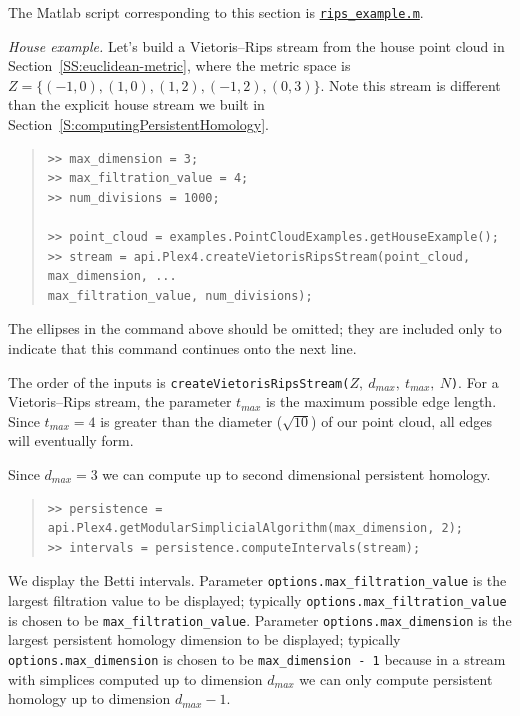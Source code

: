 \documentclass[amscd, amssymb, verbatim]{amsart}[12pt]
\theoremstyle{remark}
\theoremstyle{remark}
\theoremstyle{remark}
\begin{document}
The Matlab script corresponding to this section is \href{https://github.com/appliedtopology/javaplex/tree/master/src/matlab/for_distribution/tutorial_examples/rips_example.m}{\texttt{rips\_example.m}}. 

{\em House example.} Let's build a Vietoris--Rips stream from the house point cloud in Section~\ref{SS:euclidean-metric}, where the metric space is $Z=\{(-1,0),(1,0),(1,2),(-1,2),(0,3)\}$. Note this stream is different than the explicit house stream we built in Section~\ref{S:computingPersistentHomology}.

\begin{quote} \begin{verbatim}
>> max_dimension = 3;
>> max_filtration_value = 4;
>> num_divisions = 1000;

>> point_cloud = examples.PointCloudExamples.getHouseExample();
>> stream = api.Plex4.createVietorisRipsStream(point_cloud, max_dimension, ...
max_filtration_value, num_divisions);
\end{verbatim} \end{quote}

The ellipses in the command above should be omitted; they are included only to indicate that this command continues onto the next line. 

The order of the inputs is \texttt{createVietorisRipsStream(}$Z,\ d_{max},\ t_{max},\ N$\texttt{)}. For a Vietoris--Rips stream, the parameter $t_{max}$ is the maximum possible edge length. Since $t_{max} = 4$ is greater than the diameter ($\sqrt{10}$) of our point cloud, all edges will eventually form. 

Since $d_{max} = 3$ we can compute up to second dimensional persistent homology.

\begin{quote} \begin{verbatim}
>> persistence = api.Plex4.getModularSimplicialAlgorithm(max_dimension, 2);
>> intervals = persistence.computeIntervals(stream);
\end{verbatim} \end{quote}

We display the Betti intervals. Parameter \texttt{options.max\_filtration\_value} is the largest filtration value to be displayed; typically \texttt{options.max\_filtration\_value} is chosen to be \texttt{max\_filtration\_value}. Parameter \texttt{options.max\_dimension} is the largest persistent homology dimension to be displayed; typically \texttt{options.max\_dimension} is chosen to be \texttt{max\_dimension - 1} because in a stream with simplices computed up to dimension $d_{max}$ we can only compute persistent homology up to dimension $d_{max} - 1$.
\end{document}
